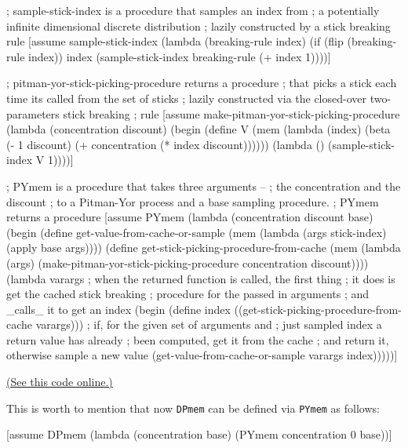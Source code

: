 \documentclass[11pt,reqno]{amsart}
\newcommand{\+}[1]{\ensuremath{{\mathbf{#1}}}}
\begin{document}
\begin{code}{}{}
; sample-stick-index is a procedure that samples an index from
; a potentially infinite dimensional discrete distribution 
; lazily constructed by a stick breaking rule
[assume sample-stick-index (lambda (breaking-rule index)
  (if (flip (breaking-rule index))
      index
      (sample-stick-index breaking-rule (+ index 1))))]


; pitman-yor-stick-picking-procedure returns a procedure 
; that picks a stick each time its called from the set of sticks
; lazily constructed via the closed-over two-parameters stick breaking
; rule
[assume make-pitman-yor-stick-picking-procedure
  (lambda (concentration discount)
    (begin
      (define V (mem (lambda (index) (beta (- 1 discount)
                                           (+ concentration (* index discount))))))
      (lambda () (sample-stick-index V 1))))] 


; PYmem is a procedure that takes three arguments --
; the concentration and the discount
; to a Pitman-Yor process and a base sampling procedure.
; PYmem returns a procedure 
[assume PYmem (lambda (concentration discount base)
  (begin 
    (define get-value-from-cache-or-sample 
                           (mem (lambda (args stick-index) 
                                        (apply base args))))
    (define get-stick-picking-procedure-from-cache 
                            (mem (lambda (args) 
              (make-pitman-yor-stick-picking-procedure
                 concentration discount))))
    (lambda varargs
        ; when the returned function is called, the first thing 
        ; it does is get the cached stick breaking 
        ; procedure for the passed in arguments
        ; and _calls_ it to get an index
        (begin 
           (define index ((get-stick-picking-procedure-from-cache varargs)))
            ; if, for the given set of arguments and 
            ; just sampled index a return value has already
            ; been computed, get it from the cache
            ; and return it, otherwise sample a new value
            (get-value-from-cache-or-sample varargs index)))))]

\end{code}
\href{http://www.robots.ox.ac.uk/~fwood/anglican/teaching/mlss2014/py_mem/code/2_1.anglican}{(See this code online.)}

This is worth to mention that now {\tt DPmem} can be defined via {\tt PYmem} as follows:

\begin{code}{}{}
[assume DPmem (lambda (concentration base) (PYmem concentration 0 base))]
\end{code}
\fi
\end{document}
